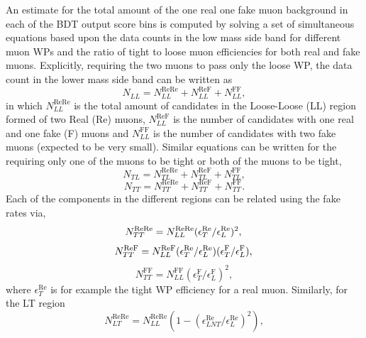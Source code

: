 An estimate for the total amount of the one real one fake muon background in each of the BDT output score bins is computed by solving a set of simultaneous equations based upon the data counts in the low mass side band for different muon WPs and the ratio of tight to loose muon efficiencies for both real and fake muons.  
Explicitly, requiring the two muons to pass only the loose WP, the data count in the lower mass side band can be written as 
\begin{equation}
  N_{LL} = N^{\text{ReRe}}_{LL} + N^{\text{ReF}}_{LL} + N^{\text{FF}}_{LL},
  \label{eq:SemiLepLL}
\end{equation}
in which $N^{\text{ReRe}}_{LL}$ is the total amount of candidates in the Loose-Loose (LL) region formed of two Real ($\text{Re}$) muons, $N^{\text{ReF}}_{LL}$ is the number of candidates with one real and one fake (F) muons and $N^{\text{FF}}_{LL}$ is the number of candidates with two fake muons (expected to be very small). 
Similar equations can be written for the requiring only one of the muons to be tight or both of the muons to be tight, 
\begin{equation}
  N_{TL} = N^{\text{ReRe}}_{TL} + N^{\text{ReF}}_{TL} + N^{\text{FF}}_{TL},
  \label{eq:SemiLepTL}
\end{equation}
\begin{equation}
  N_{TT} = N^{\text{ReRe}}_{TT} + N^{\text{ReF}}_{TT} + N^{\text{FF}}_{TT}.
  \label{eq:SemiLepTT}
\end{equation}
Each of the components in the different regions can be related using the fake rates via,
\begin{equation}
  N^\text{ReRe}_{TT} = N^\text{ReRe}_{LL} (\epsilon^{\text{Re}}_{T}/\epsilon^{\text{Re}}_{L})^{2},  \\
\end{equation}
\begin{equation}
  N^\text{ReF}_{TT} = N^\text{ReF}_{LL} (\epsilon^{\text{Re}}_{T}/\epsilon^{\text{Re}}_{L}) (\epsilon^{\text{F}}_{T}/\epsilon^{\text{F}}_{L}), \\ 
\end{equation}
\begin{equation}
  N^\text{FF}_{TT} = N^\text{FF}_{LL} (\epsilon^{\text{F}}_{T}/\epsilon^{\text{F}}_{L})^{2},  
\end{equation}
where $\epsilon^{\text{Re}}_{T}$ is for example the tight WP efficiency for a real muon. 
Similarly, for the LT region
\begin{equation}
  N^\text{ReRe}_{LT} = N^\text{ReRe}_{LL} (1-(\epsilon^{\text{Re}}_{LNT}/\epsilon^{\text{Re}}_{L})^{2}),
\end{equation}
